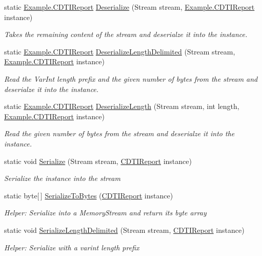 \begin{DoxyCompactItemize}
static \hyperlink{class_example_1_1_c_d_t_i_report}{Example.\+C\+D\+T\+I\+Report} \hyperlink{class_example_1_1_c_d_t_i_report_a3259ef658ecda5587d8f394849544307}{Deserialize} (Stream stream, \hyperlink{class_example_1_1_c_d_t_i_report}{Example.\+C\+D\+T\+I\+Report} instance)
\begin{DoxyCompactList}\small\item\em Takes the remaining content of the stream and deserialze it into the instance.\end{DoxyCompactList}\item 
static \hyperlink{class_example_1_1_c_d_t_i_report}{Example.\+C\+D\+T\+I\+Report} \hyperlink{class_example_1_1_c_d_t_i_report_a837fd35c86c5ecd43a9ec5b149a37c2b}{Deserialize\+Length\+Delimited} (Stream stream, \hyperlink{class_example_1_1_c_d_t_i_report}{Example.\+C\+D\+T\+I\+Report} instance)
\begin{DoxyCompactList}\small\item\em Read the Var\+Int length prefix and the given number of bytes from the stream and deserialze it into the instance.\end{DoxyCompactList}\item 
static \hyperlink{class_example_1_1_c_d_t_i_report}{Example.\+C\+D\+T\+I\+Report} \hyperlink{class_example_1_1_c_d_t_i_report_a6842f35b509032e593cac6721c53dc3f}{Deserialize\+Length} (Stream stream, int length, \hyperlink{class_example_1_1_c_d_t_i_report}{Example.\+C\+D\+T\+I\+Report} instance)
\begin{DoxyCompactList}\small\item\em Read the given number of bytes from the stream and deserialze it into the instance.\end{DoxyCompactList}\item 
static void \hyperlink{class_example_1_1_c_d_t_i_report_aa35a297b34ae5b717ad4a35b3d43dfaf}{Serialize} (Stream stream, \hyperlink{class_example_1_1_c_d_t_i_report}{C\+D\+T\+I\+Report} instance)
\begin{DoxyCompactList}\small\item\em Serialize the instance into the stream\end{DoxyCompactList}\item 
static byte\mbox{[}$\,$\mbox{]} \hyperlink{class_example_1_1_c_d_t_i_report_a45ad424e439e8f5cea9306fdf40886ba}{Serialize\+To\+Bytes} (\hyperlink{class_example_1_1_c_d_t_i_report}{C\+D\+T\+I\+Report} instance)
\begin{DoxyCompactList}\small\item\em Helper\+: Serialize into a Memory\+Stream and return its byte array\end{DoxyCompactList}\item 
static void \hyperlink{class_example_1_1_c_d_t_i_report_a587ec4906faa62164e4dd7106ab43172}{Serialize\+Length\+Delimited} (Stream stream, \hyperlink{class_example_1_1_c_d_t_i_report}{C\+D\+T\+I\+Report} instance)
\begin{DoxyCompactList}\small\item\em Helper\+: Serialize with a varint length prefix\end{DoxyCompactList}\end{DoxyCompactItemize}
